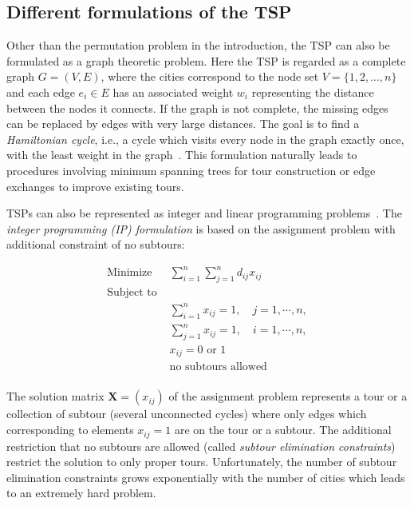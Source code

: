 \documentclass[10pt,a4paper,fleqn]{article}
\begin{document}
\subsection{Different formulations of the TSP}\label{sec:formulations}
Other than the permutation problem in the introduction, the TSP can also be
formulated as a graph theoretic problem. Here the TSP is regarded as a complete
graph $G = (V, E)$, where the cities correspond to the node set  $V =
\{1,2,\ldots,n\}$ and each edge $e_i \in E$ has an associated weight $w_i$
representing the distance between the nodes it connects.  If the graph is not
complete, the missing edges can be replaced by edges with very large distances.
The goal is to find a \emph{Hamiltonian cycle}, i.e., a cycle which visits
every node in the graph exactly once, with the least weight in the
graph~\citep{Hoffman1985}. This formulation naturally leads to procedures
involving minimum spanning trees for tour construction or edge exchanges 
to improve existing tours.

TSPs can also be represented as integer and linear programming
problems~\citep[see, e.g.,][]{Punnen2002}.  The \emph{integer programming (IP)
formulation} is based on the assignment problem with additional
constraint of no subtours:


\[
\begin{array}{rl}
    \text{Minimize }     & \sum_{i=1}^n\sum_{j=1}^n{d_{ij}x_{ij}}
                        \\[3mm]
    \text{Subject to }   & \\
                        & \sum_{i=1}^n{x_{ij}=1}, \quad j=1,\cdots,n, \\
                        & \sum_{j=1}^n{x_{ij}=1}, \quad i=1,\cdots,n, \\
                        & x_{ij} = 0 \text{ or } 1 \\
                        & \text{no subtours allowed} \\
\end{array}
\]

The solution matrix $\mathbf{X} = (x_{ij})$ of the assignment problem
represents a tour or a collection of subtour (several unconnected cycles) where
only edges which corresponding to elements $x_{ij} = 1$ are on the tour or a
subtour. The additional restriction that no subtours are allowed (called
\emph{subtour elimination constraints}) restrict the solution to only proper tours. Unfortunately, the number of subtour elimination constraints grows
exponentially with the number of cities which leads to an extremely hard
problem.
\end{document}
